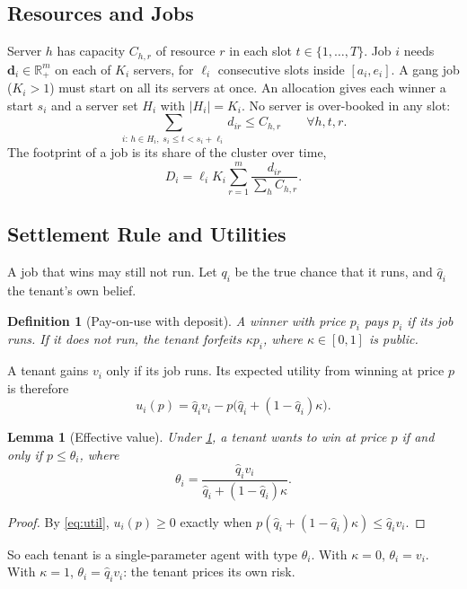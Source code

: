 \documentclass[journal]{IEEEtran}
\newtheorem{lemma}{Lemma}
\newtheorem{definition}{Definition}
\theoremstyle{remark}
\newcommand{\R}{\mathbb{R}}
\begin{document}
\subsection{Resources and Jobs}
Server $h$ has capacity $C_{h,r}$ of resource $r$ in each slot $t\in\{1,\dots,T\}$. Job $i$ needs $\mathbf{d}_i\in\R_+^m$ on each of $K_i$ servers, for $\ell_i$ consecutive slots inside $[a_i,e_i]$. A gang job ($K_i>1$) must start on all its servers at once. An allocation gives each winner a start $s_i$ and a server set $H_i$ with $|H_i|=K_i$. No server is over-booked in any slot:
\begin{equation}\label{eq:cap}
\sum_{i:\,h\in H_i,\; s_i\le t<s_i+\ell_i} d_{ir}\le C_{h,r}\qquad\forall h,t,r.
\end{equation}
The footprint of a job is its share of the cluster over time,
\begin{equation}\label{eq:footprint}
D_i=\ell_i K_i\sum_{r=1}^m \frac{d_{ir}}{\sum_{h}C_{h,r}}.
\end{equation}

\subsection{Settlement Rule and Utilities}
A job that wins may still not run. Let $q_i$ be the true chance that it runs, and $\hat q_i$ the tenant's own belief.

\begin{definition}[Pay-on-use with deposit]\label{def:settle}
A winner with price $p_i$ pays $p_i$ if its job runs. If it does not run, the tenant forfeits $\kappa p_i$, where $\kappa\in[0,1]$ is public.
\end{definition}

A tenant gains $v_i$ only if its job runs. Its expected utility from winning at price $p$ is therefore
\begin{equation}\label{eq:util}
u_i(p)=\hat q_i v_i-p\big(\hat q_i+(1-\hat q_i)\kappa\big).
\end{equation}

\begin{lemma}[Effective value]\label{lem:eff}
Under \cref{def:settle}, a tenant wants to win at price $p$ if and only if $p\le\theta_i$, where
\begin{equation}\label{eq:theta}
\theta_i=\frac{\hat q_i v_i}{\hat q_i+(1-\hat q_i)\kappa}.
\end{equation}
\end{lemma}
\begin{proof}
By \eqref{eq:util}, $u_i(p)\ge0$ exactly when $p(\hat q_i+(1-\hat q_i)\kappa)\le\hat q_iv_i$.
\end{proof}
So each tenant is a single-parameter agent with type $\theta_i$. With $\kappa=0$, $\theta_i=v_i$. With $\kappa=1$, $\theta_i=\hat q_iv_i$: the tenant prices its own risk.
\end{document}
